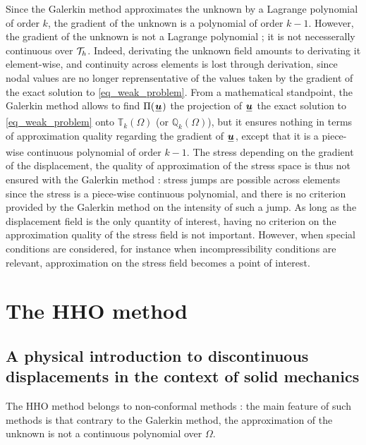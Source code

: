 \documentclass[fleqn]{article}
\begin{document}
            \par
            Since the Galerkin method approximates the unknown by a Lagrange polynomial of order $k$, the gradient of the unknown is a polynomial of order $k-1$. However, the gradient of the unknown is not a Lagrange polynomial ; it is not necesserally continuous over $\mathcal{T}_h$. Indeed, derivating the unknown field amounts to derivating it element-wise, and continuity across elements is lost through derivation, since nodal values are no longer reprensentative of the values taken by the gradient of the exact solution to \eqref{eq_weak_problem}. From a mathematical standpoint, the Galerkin method allows to find $\Pi(\tensori{u})$ the projection of $\tensori{u}$ the exact solution to \eqref{eq_weak_problem} onto $\mathbb{T}_k(\Omega)$ (or $\mathbb{Q}_k(\Omega)$), but it ensures nothing in terms of approximation quality regarding the gradient of $\tensori{u}$, except that it is a piece-wise continuous polynomial of order $k-1$.
            \newline
            The stress depending on the gradient of the displacement, the quality of approximation of the stress space is thus not ensured with the Galerkin method : stress jumps are possible across elements since the stress is a piece-wise continuous polynomial, and there is no criterion provided by the Galerkin method on the intensity of such a jump.
            \newline
            As long as the displacement field is the only quantity of interest, having no criterion on the approximation quality of the stress field is not important. However, when special conditions are considered, for instance when incompressibility conditions are relevant, approximation on the stress field becomes a point of interest.

    \section{The HHO method}

        \subsection{A physical introduction to discontinuous displacements in the context of solid mechanics}
        \label{sec_HHO_intro}

            The HHO method belongs to non-conformal methods : the main feature of such methods is that contrary to the Galerkin method, the approximation of the unknown is not a continuous polynomial over $\Omega$.
\end{document}
